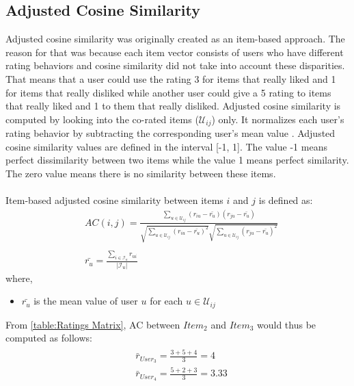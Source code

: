 \subsection{Adjusted Cosine Similarity}
Adjusted cosine similarity was originally created as an
item-based approach. The reason for that was because each item vector consists of
users who have different rating behaviors and cosine similarity did not
take into account these disparities. That means that a user could use the
rating 3 for items that really liked and 1 for items that really disliked while
another user could give a 5 rating to items that really liked and 1 to them that really
disliked. Adjusted cosine similarity is computed by looking into the co-rated items
($\mathcal{U}_{ij}$) only. It normalizes each user's rating behavior by
subtracting the corresponding user's mean value \citep{sarwar2001item}.
Adjusted cosine similarity values are defined in the interval [-1, 1].
The value -1 means perfect dissimilarity between two items while the value 1 means
perfect similarity. The zero value means there is no similarity between these items.\\\\
Item-based adjusted cosine similarity between items $i$ and $j$ is defined as:
\begin{equation}\label{eq:adjusted_cosine}
    \begin{split}
    &AC(i,j) = \frac{\sum_{u \in \mathcal{U}_{ij}}(r_{iu}-\bar{r_{u}})(r_{ju}-\bar{r_{u}})}
		    {\sqrt{\sum_{u \in \mathcal{U}_{ij}}(r_{iu}-\bar{r_{u}})^2}
                     \sqrt{\sum_{u \in \mathcal{U}_{ij}}(r_{ju}-\bar{r_{u}})^2}} \\\\
    &\bar{r_{u}} = \frac{\sum_{i \in \mathcal{I}_u}r_{ui}}
 		        {\mathopen|\mathcal{I}_u\mathclose|}
    \end{split}
\end{equation}
where,
\begin{itemize}
	\item[] $\bar{r_u}$ is the mean value of user $u$ for each $u \in \mathcal{U}_{ij}$
\end{itemize}
From \autoref{table:Ratings Matrix}, AC
between $Item_2$ and $Item_3$ would thus be computed as follows:
\begin{align*}
	\begin{split}
		&\bar{r}_{User_3} = \frac{3 + 5 + 4}{3} = 4\\
		&\bar{r}_{User_4} = \frac{5 + 2 + 3}{3} = 3.33
	\end{split}
\end{align*}
